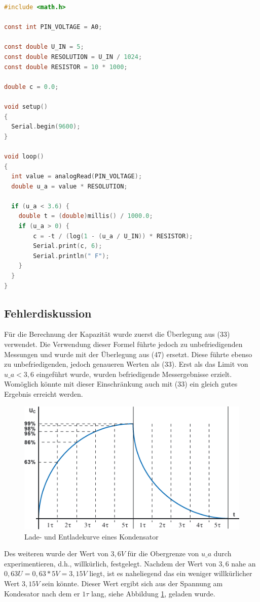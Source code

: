 \begin{lstlisting}[language=C,label={lst:a4-2-programmcode}, caption={Vollständiger Programmcode der Aufgabe 4.2}]
#include <math.h>

const int PIN_VOLTAGE = A0;

const double U_IN = 5;
const double RESOLUTION = U_IN / 1024;
const double RESISTOR = 10 * 1000;

double c = 0.0;

void setup()
{
  Serial.begin(9600);
}

void loop()
{
  int value = analogRead(PIN_VOLTAGE);
  double u_a = value * RESOLUTION;

  if (u_a < 3.6) {
    double t = (double)millis() / 1000.0;
    if (u_a > 0) {
    	c = -t / (log(1 - (u_a / U_IN)) * RESISTOR);
        Serial.print(c, 6);
        Serial.println(" F");
    }
  }
}
\end{lstlisting}

\subsection{Fehlerdiskussion}
\label{subsec:a4-fehlerdiskussion}

Für die Berechnung der Kapazität wurde zuerst die Überlegung aus (33) verwendet.
Die Verwendung dieser Formel führte jedoch zu unbefriedigenden Messungen und wurde mit der Überlegung aus (47) ersetzt.
Diese führte ebenso zu unbefriedigenden, jedoch genaueren Werten als (33).
Erst als das Limit von $u\_a < 3,6$ eingeführt wurde, wurden befriedigende Messergebnisse erzielt.
Womöglich könnte mit dieser Einschränkung auch mit (33) ein gleich gutes Ergebnis erreicht werden.

\begin{figure}[ht]
    \centering
    \includegraphics[width=\textwidth]{pictures/Kondensator-Ladekurve.png}
    \caption{Lade- und Entladekurve eines Kondensator \cite{kondesator}}
    \label{fig:lade-entladekurve-kondensator}
\end{figure}

\newpage

Des weiteren wurde der Wert von $3,6V$ für die Obergrenze von $u\_a$ durch experimentieren, d.h., willkürlich, festgelegt.
Nachdem der Wert von $3,6$ nahe an $0,63U = 0,63*5V = 3,15V$ liegt, ist es naheliegend das ein weniger willkürlicher Wert $3,15V$ sein könnte.
Dieser Wert ergibt sich aus der Spannung am Kondesator nach dem er $1\tau$ lang, siehe Abbildung \ref{fig:lade-entladekurve-kondensator}, geladen wurde.
